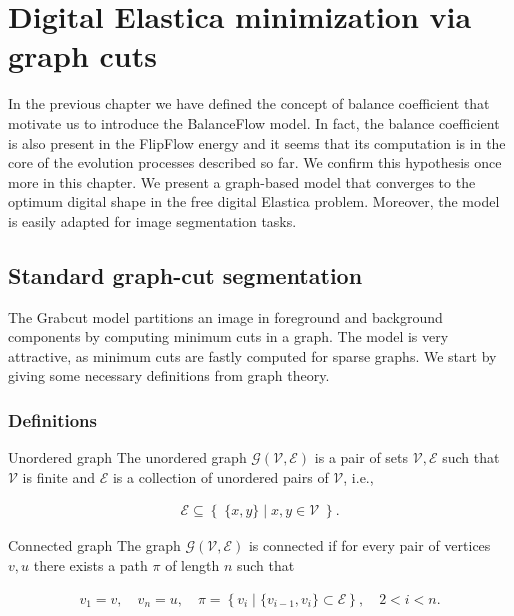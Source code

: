 \chapter{Digital Elastica minimization via graph cuts}
\label{chapter:graphflow}

In the previous chapter we have defined the concept of balance coefficient that motivate us to introduce the BalanceFlow model. In fact, the balance coefficient is also present in the FlipFlow energy and it seems that its computation is in the core of the evolution processes described so far. We confirm this hypothesis once more in this chapter. We present a graph-based model that converges to the optimum digital shape in the free digital Elastica problem. Moreover, the model is easily adapted for image segmentation tasks.

\section{Standard graph-cut segmentation}
The Grabcut model \cite{rother04grabcut} partitions an image in foreground and background components by computing minimum cuts in a graph. The model is very attractive, as minimum cuts are fastly computed for sparse graphs. We start by giving some necessary definitions from graph theory.

\subsection{Definitions}

\begin{definition}{Unordered graph}
The unordered graph $\mathcal{G}(\mathcal{V},\mathcal{E})$ is a pair of sets $\mathcal{V},\mathcal{E}$ such that $\mathcal{V}$ is finite and $\mathcal{E}$ is a collection of unordered pairs of $\mathcal{V}$, i.e., 

\begin{align*}
\mathcal{E} \subseteq  \left\{ \; \{x,y\} \; | \; x,y \in \mathcal{V} \; \right\}.
\end{align*}

\end{definition}

\begin{definition}{Connected graph}
The graph $\mathcal{G}(\mathcal{V},\mathcal{E})$ is connected if for every pair of vertices $v,u$ there exists a path $\pi$ of length $n$ such that

\begin{align*}
	v_1 = v, \quad v_n = u, \quad 	\pi = \left\{ v_i \; | \; \{v_{i-1},v_{i}\} \subset \mathcal{E} \right\},\quad  2<i<n.
\end{align*}
\end{definition}

